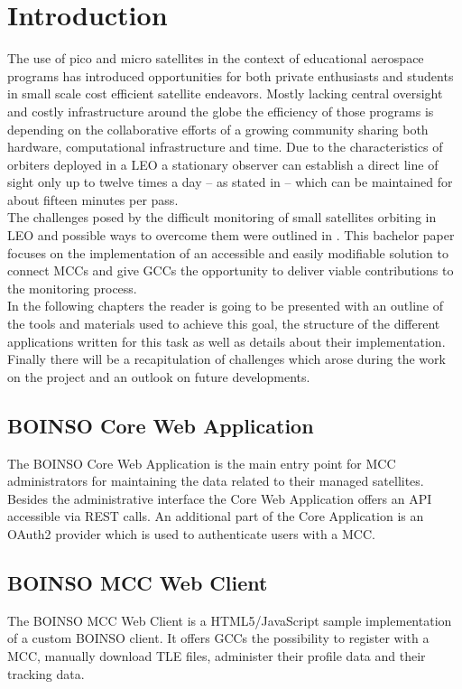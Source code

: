 \documentclass[BachelorPaper]{subfiles}
\begin{document}
\chapter{Introduction}
The use of pico and micro satellites in the context of educational aerospace programs has introduced opportunities for both private enthusiasts and students in small scale cost efficient satellite endeavors. Mostly lacking central oversight and costly infrastructure around the globe the efficiency of those programs is depending on the collaborative efforts of a growing community sharing both hardware, computational infrastructure and time. Due to the characteristics of orbiters deployed in a \ac{LEO} a stationary observer  can establish a direct line of sight only up to twelve times a day -- as stated in \cite{kief_genso_2011} -- which can be maintained for about fifteen minutes per pass.\\

The challenges posed by the difficult monitoring of small satellites orbiting in \ac{LEO} and possible ways to overcome them were outlined in \cite{beyerle_boinso_2014}. This bachelor paper focuses on the implementation of an accessible and easily modifiable solution to connect \acp{MCC} and give \acp{GCC} the opportunity to deliver viable contributions to the monitoring process.\\

In the following chapters the reader is going to be presented with an outline of the tools and materials used to achieve this goal, the structure of the different applications written for this task as well as details about their implementation. Finally there will be a recapitulation of challenges which arose during the work on the project and an outlook on future developments.

\section{BOINSO Core Web Application}
The BOINSO Core Web Application is the main entry point for \ac{MCC} administrators for maintaining the data related to their managed satellites. Besides the administrative interface the Core Web Application offers an \ac{API} accessible via \ac{REST} calls. An additional part of the Core Application is an OAuth2 provider which is used to authenticate users with a \ac{MCC}.

\section{BOINSO MCC Web Client}
The BOINSO MCC Web Client is a HTML5/JavaScript sample implementation of a custom BOINSO client. It offers \acp{GCC} the possibility to register with a \ac{MCC}, manually download \ac{TLE} files, administer their profile data and their tracking data.
\end{document}
